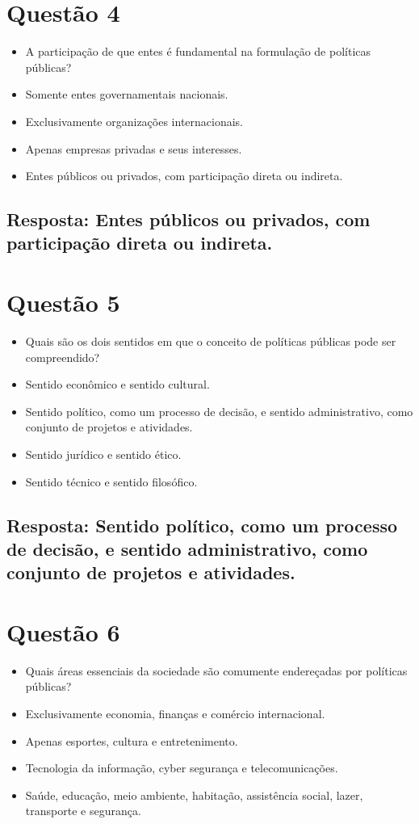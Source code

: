 \documentclass[
   article,       
   12pt,          
   oneside,       
   a4paper,       
   english,       
   brazil,        
   sumario=tradicional
   ]{abntex2}
\begin{document}
\section{Questão 4}
\begin{itemize}
    \item A participação de que entes é fundamental na formulação de políticas públicas?
    \item Somente entes governamentais nacionais.
    \item Exclusivamente organizações internacionais.
    \item Apenas empresas privadas e seus interesses.
    \item Entes públicos ou privados, com participação direta ou indireta.
\end{itemize}
\subsection{Resposta: Entes públicos ou privados, com participação direta ou indireta.}

\section{Questão 5}
\begin{itemize}
    \item Quais são os dois sentidos em que o conceito de políticas públicas pode ser compreendido?
    \item Sentido econômico e sentido cultural.
    \item Sentido político, como um processo de decisão, e sentido administrativo, como conjunto de projetos e atividades.
    \item Sentido jurídico e sentido ético.
    \item Sentido técnico e sentido filosófico.
\end{itemize}
\subsection{Resposta: Sentido político, como um processo de decisão, e sentido administrativo, como conjunto de projetos e atividades.}

\section{Questão 6}
\begin{itemize}
    \item Quais áreas essenciais da sociedade são comumente endereçadas por políticas públicas?
    \item Exclusivamente economia, finanças e comércio internacional.
    \item Apenas esportes, cultura e entretenimento.
    \item Tecnologia da informação, cyber segurança e telecomunicações.
    \item Saúde, educação, meio ambiente, habitação, assistência social, lazer, transporte e segurança.
\end{itemize}
\end{document}
